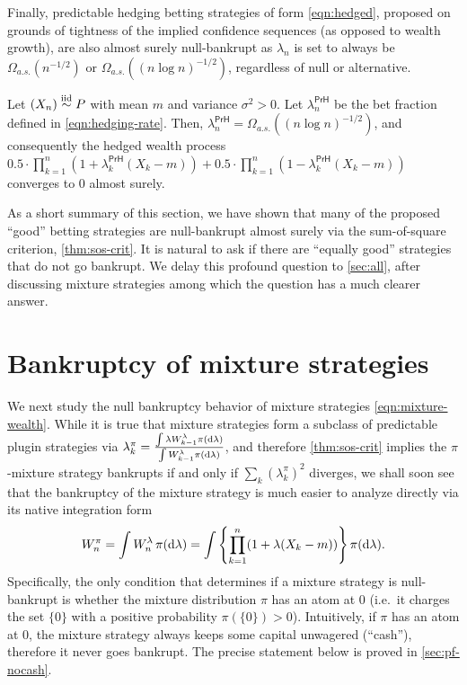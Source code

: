 Finally,  predictable hedging betting strategies of form \eqref{eqn:hedged}, proposed on grounds of tightness of the implied confidence sequences (as opposed to wealth growth), are also almost surely null-bankrupt as $\lambda_n$ is set to always be $\Omega_{a.s.}(n^{-1/2})$ or $\Omega_{a.s.}((n \log n)^{-1/2})$, regardless of null or alternative.

\begin{proposition} Let $(X_n)\overset{\mathrm{iid}}{\sim} P$ with mean $m$ and variance $\sigma^2 > 0$.
    Let $\lambda_n^{\mathsf{PrH}}$ be the bet fraction defined in \eqref{eqn:hedging-rate}. 
    Then, $\lambda_n^{\mathsf{PrH}} = \Omega_{a.s.}((n \log n)^{-1/2})$, and consequently the hedged wealth process $0.5\cdot\prod_{k=1}^n(1+\lambda_k^{\mathsf{PrH}}(X_k - m)) +0.5\cdot \prod_{k=1}^n(1-\lambda_k^{\mathsf{PrH}}(X_k - m))$ converges to 0 almost surely.
\end{proposition}

As a short summary of this section, we have shown that many of the proposed ``good'' betting strategies are null-bankrupt almost surely via the sum-of-square criterion, \cref{thm:sos-crit}. It is natural to ask if there are ``equally good'' strategies that do not go bankrupt. We delay this profound question to \cref{sec:all}, after discussing mixture strategies among which the question has a much clearer answer.

\section{Bankruptcy of mixture strategies}

We next study the null bankruptcy behavior of mixture strategies \eqref{eqn:mixture-wealth}. While it is true that mixture strategies form a subclass of predictable plugin strategies via $\lambda_k^\pi = \frac{\int \lambda W_{k-1}^\lambda  \pi(\mathrm{d} \lambda) }{ \int W_{k-1}^\lambda  \pi(\mathrm{d} \lambda) }$, and therefore \cref{thm:sos-crit} implies the $\pi$-mixture strategy bankrupts if and only if $\sum_k (\lambda_k^\pi)^2$ diverges, we shall soon see that the bankruptcy of the mixture strategy is much easier to analyze directly via its native integration form
\begin{equation}
    W_n^\pi = \int W_n^\lambda \, \pi(\mathrm{d} \lambda) = \int \left\{\prod_{k=1}^n (1 + \lambda(X_k - m))  \right\} \pi(\mathrm{d} \lambda).
\end{equation}
Specifically, the only condition that determines if a mixture strategy is null-bankrupt is whether the mixture distribution $\pi$ has an atom at 0 (i.e.\ it charges the set $\{0\}$ with a positive probability $\pi(\{0\})>0$). Intuitively, if $\pi$ has an atom at 0, the mixture strategy always keeps some capital unwagered (``cash''), therefore it never goes bankrupt. The precise statement below is proved in \cref{sec:pf-nocash}.



